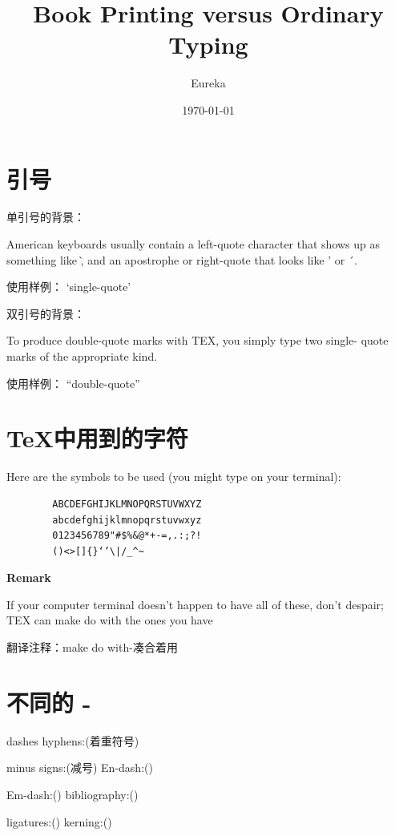 \documentclass[fontset=windows, 12pt]{article}
\title{Book Printing versus Ordinary Typing}
\author{Eureka}
\date{\today}
\newcommand{\trans}[1]{\songti 翻译注释：#1}
\begin{document}
\maketitle
    
\section{引号}

单引号的背景：

American keyboards usually contain a left-quote
character that shows up as something like \`, and an apostrophe or right-quote
that looks like ' or ´.

使用样例： `single-quote'


\bigskip
双引号的背景：

To produce double-quote marks with TEX, you simply type two single-
quote marks of the appropriate kind.

使用样例： ``double-quote''


\section{\TeX 中用到的字符}
Here are the symbols to be used (you might type on your terminal):

\begin{verbatim}
        ABCDEFGHIJKLMNOPQRSTUVWXYZ
        abcdefghijklmnopqrstuvwxyz
        0123456789"#$%&@*+-=,.:;?!
        ()<>[]{}‘’\|/_^~
\end{verbatim}

\textbf{Remark}

If your computer terminal doesn't happen to have all of these, don’t despair;
TEX can make do with the ones you have

\trans{make do with-凑合着用}

\clearpage
\section{不同的 -}
    dashes\hspace*{10em}
    hyphens:(着重符号)

    minus signs:(减号)\hspace*{10em}
    En-dash:()

    Em-dash:()\hspace*{10em}
    bibliography:()

    ligatures:()\hspace*{10em}
    kerning:()
\end{document}
